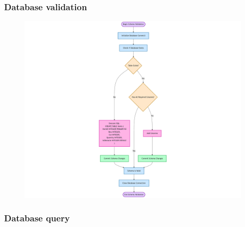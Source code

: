 \newpage

\subsubsection{Database validation}

\begin{figure}[htbp]
    \centering
    \includegraphics[width=1\linewidth]{Flowcharts/dbinit.png}
\end{figure}

\newpage

\subsubsection{Database query}

